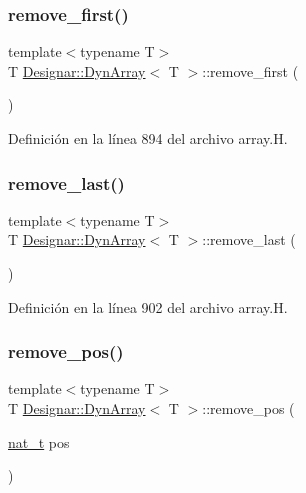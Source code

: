\subsubsection{\texorpdfstring{remove\+\_\+first()}{remove\_first()}}
{\footnotesize\ttfamily template$<$typename T$>$ \\
T \hyperlink{class_designar_1_1_dyn_array}{Designar\+::\+Dyn\+Array}$<$ T $>$\+::remove\+\_\+first (\begin{DoxyParamCaption}{ }\end{DoxyParamCaption})\hspace{0.3cm}{\ttfamily [inline]}}



Definición en la línea 894 del archivo array.\+H.

\mbox{\label{class_designar_1_1_dyn_array_a3e96bcac8a97cb56544d6466e834f8ac}} 
\subsubsection{\texorpdfstring{remove\+\_\+last()}{remove\_last()}}
{\footnotesize\ttfamily template$<$typename T$>$ \\
T \hyperlink{class_designar_1_1_dyn_array}{Designar\+::\+Dyn\+Array}$<$ T $>$\+::remove\+\_\+last (\begin{DoxyParamCaption}{ }\end{DoxyParamCaption})\hspace{0.3cm}{\ttfamily [inline]}}



Definición en la línea 902 del archivo array.\+H.

\mbox{\label{class_designar_1_1_dyn_array_a85bfa3cc9b650ae6774c17bd4a03c677}} 
\subsubsection{\texorpdfstring{remove\+\_\+pos()}{remove\_pos()}}
{\footnotesize\ttfamily template$<$typename T$>$ \\
T \hyperlink{class_designar_1_1_dyn_array}{Designar\+::\+Dyn\+Array}$<$ T $>$\+::remove\+\_\+pos (\begin{DoxyParamCaption}\item[{\hyperlink{namespace_designar_aa72662848b9f4815e7bf31a7cf3e33d1}{nat\+\_\+t}}]{pos }\end{DoxyParamCaption})\hspace{0.3cm}{\ttfamily [inline]}}




